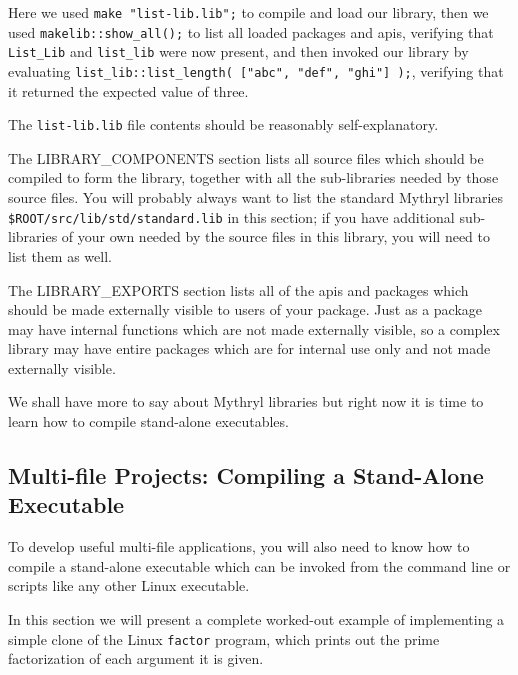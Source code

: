 Here we used {\tt make "list-lib.lib";} to compile and load our library, 
then we used {\tt makelib::show\_all();} to list all loaded packages and apis, 
verifying that {\tt List\_Lib} and {\tt list\_lib} were now present, and then 
invoked our library by evaluating {\tt list\_lib::list\_length( ["abc", "def", "ghi"] );}, 
verifying that it returned the expected value of three.

The {\tt list-lib.lib} file contents should be reasonably self-explanatory.

The {\sc LIBRARY\_COMPONENTS} section lists all source files which should be 
compiled to form the library, together with all the sub-libraries needed by 
those source files.  You will probably always want to list the standard 
Mythryl libraries {\tt \verb|$ROOT/src/lib/std/standard.lib|} in this section; if 
you have additional sub-libraries of your own needed by the source files 
in this library, you will need to list them as well.

The {\sc LIBRARY\_EXPORTS} section lists all of the apis and packages which 
should be made externally visible to users of your package.  Just as a 
package may have internal functions which are not made externally visible, 
so a complex library may have entire packages which are for internal use 
only and not made externally visible.

We shall have more to say about Mythryl libraries 
 but right 
now it is time to learn how to compile stand-alone executables.

\cutend*

\subsection{Multi-file Projects: Compiling a Stand-Alone Executable}
\label{section:tut:delving-deeper:compiling-a-stand-alone-executable}

To develop useful multi-file applications, you will also need to know how 
to compile a stand-alone executable which can be invoked from the 
command line or scripts like any other Linux executable.

In this section we will present a complete worked-out example of 
implementing a simple clone of the Linux {\tt factor} program, 
which prints out the prime factorization of each argument it is 
given.

